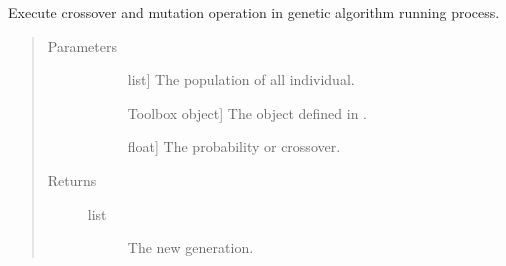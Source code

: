 \documentclass[letterpaper,10pt,english]{sphinxmanual}
\begin{document}

\begin{fulllineitems}
\label{\detokenize{pygace:pygace.ga.gaceVarAnd}}
\sphinxAtStartPar
Execute crossover and mutation operation in genetic algorithm running
process.
\begin{quote}\begin{description}
\item[{Parameters}] \leavevmode\begin{description}
\item[{}] \leavevmode{[}list{]}
\sphinxAtStartPar
The population of all individual.

\item[{}] \leavevmode{[}Toolbox object{]}
\sphinxAtStartPar
The  object defined in .

\item[{}] \leavevmode{[}float{]}
\sphinxAtStartPar
The probability or crossover.

\end{description}

\item[{Returns}] \leavevmode\begin{description}
\item[{list}] \leavevmode
\sphinxAtStartPar
The new generation.

\end{description}

\end{description}\end{quote}

\end{fulllineitems}

\end{document}
